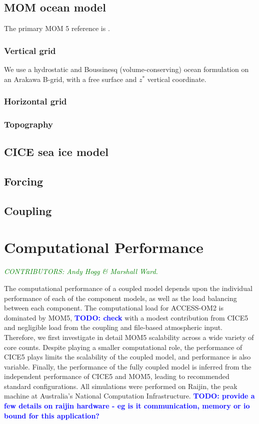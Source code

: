 \documentclass[gmd, manuscript]{copernicus}
\newcommand{\CONTRIBUTORS}[1]{\textcolor{green}{\textsf{\textsl{CONTRIBUTORS: #1}}}}
\newcommand{\TODO}[1]{\textcolor{blue}{\textsf{\textbf{TODO: #1}}}}
\begin{document}
\subsection{MOM ocean model}
The primary MOM 5 reference is \citet{Griffies2012a}.
\subsubsection{Vertical grid}
We use a hydrostatic and Boussinesq (volume-conserving) ocean formulation on an Arakawa B-grid, with a free surface and $z^*$ vertical coordinate.
\subsubsection{Horizontal grid}
\subsubsection{Topography}

\subsection{CICE sea ice model}
\subsection{Forcing}
\subsection{Coupling}

\section{Computational Performance}
\CONTRIBUTORS{Andy Hogg \& Marshall Ward.}

The computational performance of a coupled model depends upon the individual performance of each of the component models, as well as the load balancing between each component.
The computational load for ACCESS-OM2 is dominated by MOM5, \TODO{check} with a modest contribution from CICE5 and negligible load from the coupling and file-based atmospheric input.
Therefore, we first investigate in detail MOM5 scalability across a wide variety of core counts.
Despite playing a smaller computational role, the performance of CICE5 plays limits the scalability of the coupled model, and performance is also variable.
Finally, the performance of the fully coupled model is inferred from the independent performance of CICE5 and MOM5, leading to recommended standard configurations.
All simulations were performed on Raijin, the peak machine at Australia's National Computation Infrastructure.
\TODO{provide a few details on raijin hardware - eg is it communication, memory or io bound for this application?}
\end{document}
